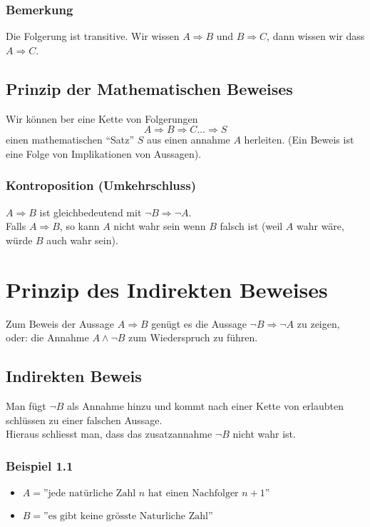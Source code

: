 \subsubsection*{Bemerkung}
Die Folgerung ist transitive. Wir wissen $A\Rightarrow B$ und $B\Rightarrow C$, dann wissen wir dass $A\Rightarrow C$.

\subsection*{Prinzip der Mathematischen Beweises}
Wir können ber eine Kette von Folgerungen $$A\Rightarrow B \Rightarrow C \dots \Rightarrow S$$
einen mathematischen ``Satz'' $S$ aus einen annahme $A$ herleiten. (Ein Beweis ist eine Folge von Implikationen von Aussagen). 
\subsubsection*{Kontroposition (Umkehrschluss)}
$A\Rightarrow B$ ist gleichbedeutend mit $\lnot B\Rightarrow\lnot A$.\\
Falls $A\Rightarrow B$, so kann $A$ nicht wahr sein wenn $B$ falsch ist (weil $A$ wahr wäre, würde $B$ auch wahr sein).

\section{Prinzip des Indirekten Beweises}
Zum Beweis der Aussage $A\Rightarrow B$ genügt es die Aussage $\lnot B\Rightarrow\lnot A$ zu zeigen, oder: die Annahme $A\land\lnot B$ zum Wiederspruch zu führen.

\subsection*{Indirekten Beweis}
Man fügt $\lnot B$ als Annahme hinzu und kommt nach einer Kette von erlaubten schlüssen zu einer falschen Aussage.\\

\noindent Hieraus schliesst man, dass das zusatzannahme $\lnot B$ nicht wahr ist. 

\subsubsection*{Beispiel 1.1}
\begin{itemize}
\item $A=\text{''jede natürliche Zahl } n \text{ hat einen Nachfolger } n+1\text{''}$
\item $B=\text{''es gibt keine grösste Naturliche Zahl''}$
\end{itemize}

